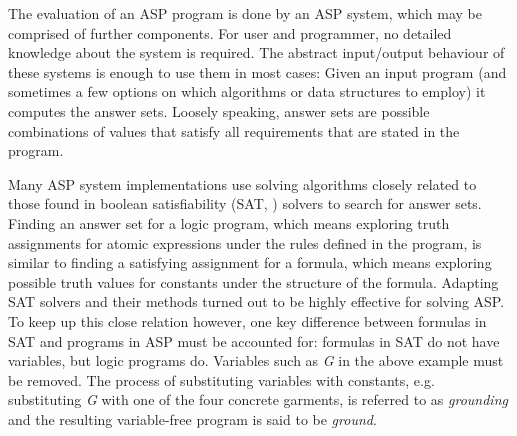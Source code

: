 \documentclass[final]{vutinfth} %
\begin{document}
The evaluation of an ASP program is done by an ASP system, which may be comprised of further components. For user and programmer, no detailed knowledge about the system is required. The abstract input/output behaviour of these systems is enough to use them in most cases: Given an input program (and sometimes a few options on which algorithms or data structures to employ) it computes the answer sets. Loosely speaking, answer sets are possible combinations of values that satisfy all requirements that are stated in the program.


Many ASP system implementations use solving algorithms closely related to those found in boolean satisfiability (SAT, \cite{sat}) solvers to search for answer sets. Finding an answer set for a logic program, which means exploring truth assignments for atomic expressions under the rules defined in the program, is similar to finding a satisfying assignment for a formula, which means exploring possible truth values for constants under the structure of the formula. Adapting SAT solvers and their methods turned out to be highly effective for solving ASP. To keep up this close relation however, one key difference between formulas in SAT and programs in ASP must be accounted for: formulas in SAT do not have variables, but logic programs do. Variables such as \emph{G} in the above example must be removed. The process of substituting variables with constants, e.g. substituting \emph{G} with one of the four concrete garments, is referred to as \emph{grounding} and the resulting variable-free program is said to be \emph{ground}.
\end{document}
